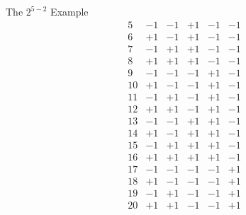 \begin{itemize}
\begin{Example}{The $ 2^{5-2} $ Example}{}
\[\begin{array}{cccccc}
                      5                & -1              & -1              & +1              & -1              & -1              \\
                      6                & +1              & -1              & +1              & -1              & -1              \\
                      7                & -1              & +1              & +1              & -1              & -1              \\
                      8                & +1              & +1              & +1              & -1              & -1              \\
                      9                & -1              & -1              & -1              & +1              & -1              \\
                      10               & +1              & -1              & -1              & +1              & -1              \\
                      11               & -1              & +1              & -1              & +1              & -1              \\
                      12               & +1              & +1              & -1              & +1              & -1              \\
                      13               & -1              & -1              & +1              & +1              & -1              \\
                      14               & +1              & -1              & +1              & +1              & -1              \\
                      15               & -1              & +1              & +1              & +1              & -1              \\
                      16               & +1              & +1              & +1              & +1              & -1              \\
                      17               & -1              & -1              & -1              & -1              & +1              \\
                      18               & +1              & -1              & -1              & -1              & +1              \\
                      19               & -1              & +1              & -1              & -1              & +1              \\
                      20               & +1              & +1              & -1              & -1              & +1              \\

\end{array}\]
\end{Example}
\end{itemize}
